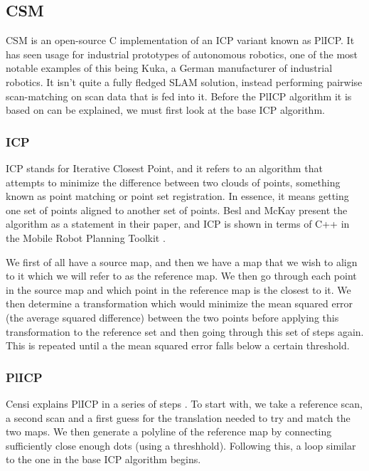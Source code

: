 				\subsection{CSM}
				CSM is an open-source C implementation of an ICP variant known as PlICP. It has seen usage for industrial prototypes of autonomous robotics, one of the most notable examples of this being Kuka, a German manufacturer of industrial robotics. It isn't quite a fully fledged SLAM solution, instead performing pairwise scan-matching on scan data that is fed into it. Before the PlICP algorithm it is based on can be explained, we must first look at the base ICP algorithm.
			
					\subsubsection{ICP}
					ICP stands for Iterative Closest Point, and it refers to an algorithm that attempts to minimize the difference between two clouds of points, something known as point matching or point set registration. In essence, it means getting one set of points aligned to another set of points. Besl and McKay present the algorithm as a statement \cite{besl1992method} in their paper, and ICP is shown in terms of C++ in the Mobile Robot Planning Toolkit \citep{mrpt2013icp}. 
					
					We first of all have a source map, and then we have a map that we wish to align to it which we will refer to as the reference map. We then go through each point in the source map and which point in the reference map is the closest to it. We then determine a transformation which would minimize the mean squared error (the average squared difference) between the two points before applying this transformation to the reference set and then going through this set of steps again. This is repeated until a the mean squared error falls below a certain threshold.
					
					\subsubsection{PlICP}
					Censi explains PlICP in a series of steps \citep{censi2008icp}. To start with, we take a reference scan, a second scan and a first guess for the translation needed to try and match the two maps. We then generate a polyline of the reference map by connecting sufficiently close enough dots (using a threshhold). Following this, a loop similar to the one in the base ICP algorithm begins.
					
